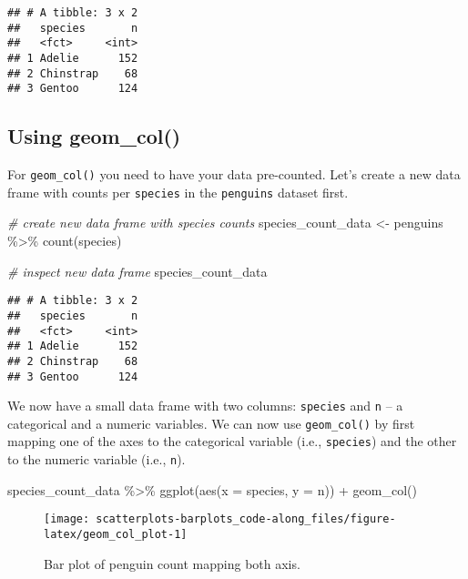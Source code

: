 \documentclass[
]{article}
\newenvironment{Shaded}{\begin{snugshade}}{\end{snugshade}}
\newcommand{\AttributeTok}[1]{\textcolor[rgb]{0.77,0.63,0.00}{#1}}
\newcommand{\CommentTok}[1]{\textcolor[rgb]{0.56,0.35,0.01}{\textit{#1}}}
\newcommand{\FunctionTok}[1]{\textcolor[rgb]{0.00,0.00,0.00}{#1}}
\newcommand{\NormalTok}[1]{#1}
\newcommand{\OtherTok}[1]{\textcolor[rgb]{0.56,0.35,0.01}{#1}}
\newcommand{\SpecialCharTok}[1]{\textcolor[rgb]{0.00,0.00,0.00}{#1}}
\begin{document}
\begin{verbatim}
## # A tibble: 3 x 2
##   species       n
##   <fct>     <int>
## 1 Adelie      152
## 2 Chinstrap    68
## 3 Gentoo      124
\end{verbatim}

\hypertarget{using-geom_col}{%
\subsection{Using geom\_col()}\label{using-geom_col}}

For \texttt{geom\_col()} you need to have your data pre-counted. Let's
create a new data frame with counts per \texttt{species} in the
\texttt{penguins} dataset first.

\begin{Shaded}
\begin{Highlighting}[]
\CommentTok{\# create new data frame with species counts}
\NormalTok{species\_count\_data }\OtherTok{\textless{}{-}}\NormalTok{ penguins }\SpecialCharTok{\%\textgreater{}\%}
  \FunctionTok{count}\NormalTok{(species)}

\CommentTok{\# inspect new data frame}
\NormalTok{species\_count\_data}
\end{Highlighting}
\end{Shaded}

\begin{verbatim}
## # A tibble: 3 x 2
##   species       n
##   <fct>     <int>
## 1 Adelie      152
## 2 Chinstrap    68
## 3 Gentoo      124
\end{verbatim}

We now have a small data frame with two columns: \texttt{species} and
\texttt{n} -- a categorical and a numeric variables. We can now use
\texttt{geom\_col()} by first mapping one of the axes to the categorical
variable (i.e., \texttt{species}) and the other to the numeric variable
(i.e., \texttt{n}).

\begin{Shaded}
\begin{Highlighting}[]
\NormalTok{species\_count\_data }\SpecialCharTok{\%\textgreater{}\%}
  \FunctionTok{ggplot}\NormalTok{(}\FunctionTok{aes}\NormalTok{(}\AttributeTok{x =}\NormalTok{ species, }\AttributeTok{y =}\NormalTok{ n)) }\SpecialCharTok{+}
  \FunctionTok{geom\_col}\NormalTok{()}
\end{Highlighting}
\end{Shaded}

\begin{figure}

{\centering \texttt{[image: scatterplots-barplots\_code-along\_files/figure-latex/geom\_col\_plot-1]} 

}

\caption{Bar plot of penguin count mapping both axis.}\label{fig:geom_col_plot}
\end{figure}
\end{document}
